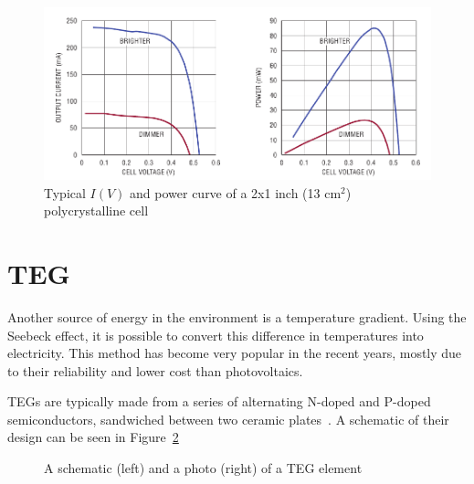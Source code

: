 \documentclass[a4paper,10pt]{article}
\begin{document}
\begin{figure}
\includegraphics[width=\textwidth]{./Slike/PV-power-curve}
 \caption{Typical $I(V)$ and power curve of a 2x1 inch (13 cm$^2$) polycrystalline cell~\cite{Burgoine11}}
\label{fig:pv-power-curve}
\end{figure}


\section{\acl{TEG}}

Another source of energy in the environment is a temperature gradient. Using the Seebeck effect, it is possible to convert this difference in temperatures into electricity. This method has become very popular in the recent years, mostly due to their reliability and lower cost than photovoltaics. 

\acp{TEG} are typically made from a series of alternating N-doped and P-doped semiconductors, sandwiched between two ceramic plates~\cite{salerno10}. A schematic of their design can be seen in Figure~\ref{fig:teg-schematic}

\begin{figure}[h]
\caption{A schematic (left) and a photo (right) of a \ac{TEG} element~\cite{salerno10,wiki:teg}}
\label{fig:teg-schematic}
\end{figure}
\end{document}
